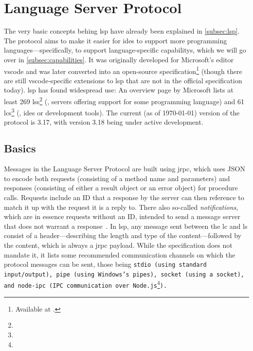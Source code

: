 \documentclass[../thesis]{subfiles}
\begin{document}
\section{Language Server Protocol}\label{sec:lsp}
The very basic concepts behing \gls{lsp} have already been explained in \cref{subsec:lsp}.
The protocol aims to make it easier for \glspl{ide} to support more programming languages---specifically, to support language-specific \glspl{capability}, which we will go over in \cref{subsec:capabilities}.
It was originally developed for Microsoft's editor \gls{vscode} and was later converted into an open-source specification\footnote{
	Available at .
} (though there are still \gls{vscode}-specific extensions to \gls{lsp} that are not in the official specification today).
\gls{lsp} has found widespread use:
An overview page by Microsoft lists at least 269 \glspl{ls}\footnote{} (\ie, servers offering support for some programming language) and 61 \glspl{lc}\footnote{} (\ie, \glspl{ide} or development tools).
The current (as of \today{}) version of the protocol is 3.17, with version 3.18 being under active development.

\subsection{Basics}\label{subsec:lspbasics}
Messages in the Language Server Protocol are built using \gls{jrpc}, which uses JSON to encode both requests (consisting of a method name and parameters) and responses (consisting of either a result object or an error object) for procedure calls.
Requests include an ID that a response by the server can then reference to match it up with the request it is a reply to.
There also so-called \emph{notifications}, which are in essence requests without an ID, intended to send a message server that does not warrant a response~\cite{jsonrpc,json}.
In \gls{lsp}, any message sent between the \gls{lc} and \gls{ls} consist of a header---describing the length and type of the content---followed by the content, which is always a \gls{jrpc} payload.
While the specification does not mandate it, it lists some recommended communication channels on which the protocol messages can be sent, those being \tt{stdio} (using standard input/output), \tt{pipe} (using Windows's pipes), \tt{socket} (using a socket), and \tt{node-ipc} (IPC communication over Node.js\footnote{}).
\end{document}
